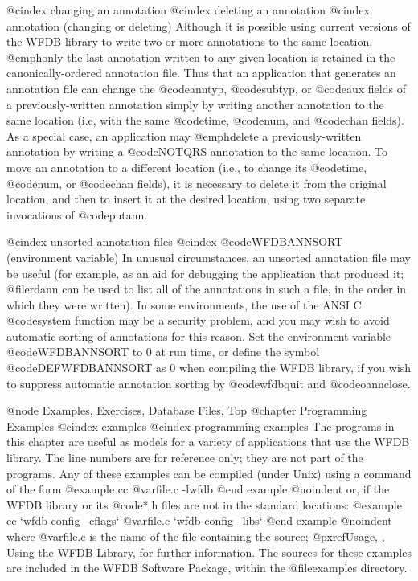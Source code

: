 {{{{{{{{{@cindex changing an annotation
@cindex deleting an annotation
@cindex annotation (changing or deleting)
Although it is possible using current versions of the WFDB library to write two
or more annotations to the same location, @emph{only the last annotation
written to any given location is retained} in the canonically-ordered
annotation file.  Thus that an application that generates an annotation file
can change the @code{anntyp}, @code{subtyp}, or @code{aux} fields of a
previously-written annotation simply by writing another annotation to the same
location (i.e, with the same @code{time}, @code{num}, and @code{chan} fields).
As a special case, an application may @emph{delete} a previously-written
annotation by writing a @code{NOTQRS} annotation to the same location.  To move
an annotation to a different location (i.e., to change its @code{time},
@code{num}, or @code{chan} fields), it is necessary to delete it from the
original location, and then to insert it at the desired location, using two
separate invocations of @code{putann}.

@cindex unsorted annotation files
@cindex @code{WFDBANNSORT} (environment variable)
In unusual circumstances, an unsorted annotation file may be useful (for
example, as an aid for debugging the application that produced it; @file{rdann}
can be used to list all of the annotations in such a file, in the order in
which they were written).  In some environments, the use of the ANSI C
@code{system} function may be a security problem, and you may wish to avoid
automatic sorting of annotations for this reason.  Set the environment variable
@code{WFDBANNSORT} to 0 at run time, or define the symbol @code{DEFWFDBANNSORT}
as 0 when compiling the WFDB library, if you wish to suppress automatic
annotation sorting by @code{wfdbquit} and @code{oannclose}.

@node Examples, Exercises, Database Files, Top
@chapter Programming Examples
@cindex examples
@cindex programming examples
The programs in this chapter are useful as models for a variety of
applications that use the WFDB library.  The line numbers are for
reference only; they are not part of the programs.  Any of these
examples can be compiled (under Unix) using a command of the form
@example
cc @var{file.c} -lwfdb
@end example
@noindent
or, if the WFDB library or its @code{*.h} files are not in the standard
locations:
@example
cc `wfdb-config --cflags` @var{file.c} `wfdb-config --libs`
@end example
@noindent
where @var{file.c} is the name of the file containing the source;
@pxref{Usage, , Using the WFDB Library}, for further information.
The sources for these examples are included in the WFDB Software Package,
within the @file{examples} directory.

}}}}}}}}}
